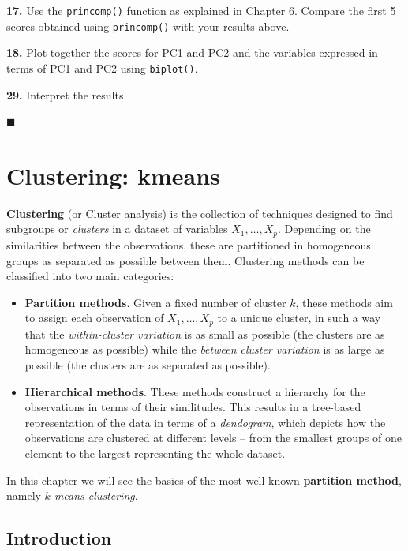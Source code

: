\documentclass[]{book}
\providecommand{\tightlist}{%
  \setlength{\itemsep}{0pt}\setlength{\parskip}{0pt}}
\begin{document}
\textbf{17.} Use the \texttt{princomp()} function as explained in
Chapter 6. Compare the first 5 scores obtained using \texttt{princomp()}
with your results above.

\textbf{18.} Plot together the scores for PC1 and PC2 and the variables
expressed in terms of PC1 and PC2 using \texttt{biplot()}.

\textbf{29.} Interpret the results.

◼

\chapter{Clustering: kmeans}\label{clustering-kmeans}

\textbf{Clustering} (or Cluster analysis) is the collection of
techniques designed to find subgroups or \emph{clusters} in a dataset of
variables \(X_1,\ldots,X_p\). Depending on the similarities between the
observations, these are partitioned in homogeneous groups as separated
as possible between them. Clustering methods can be classified into two
main categories:

\begin{itemize}
\tightlist
\item
  \textbf{Partition methods}. Given a fixed number of cluster \(k\),
  these methods aim to assign each observation of \(X_1,\ldots,X_p\) to
  a unique cluster, in such a way that the \emph{within-cluster
  variation} is as small as possible (the clusters are as homogeneous as
  possible) while the \emph{between cluster variation} is as large as
  possible (the clusters are as separated as possible).
\item
  \textbf{Hierarchical methods}. These methods construct a hierarchy for
  the observations in terms of their similitudes. This results in a
  tree-based representation of the data in terms of a \emph{dendogram},
  which depicts how the observations are clustered at different levels
  -- from the smallest groups of one element to the largest representing
  the whole dataset.
\end{itemize}

In this chapter we will see the basics of the most well-known
\textbf{partition method}, namely \emph{\(k\)-means clustering}.

\section{Introduction}\label{introduction-3}
\end{document}
